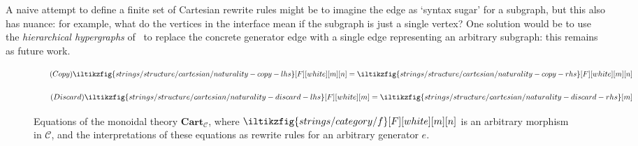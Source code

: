 \begin{remark}
    A naive attempt to define a finite set of Cartesian rewrite rules might be
    to imagine the edge as `syntax sugar' for a subgraph, but this also has
    nuance: for example, what do the vertices in the interface mean if the subgraph is just a
    single vertex?
    One solution would be to use the \emph{hierarchical hypergraphs}
    of~\cite{alvarez-picallo2022rewriting} to replace the concrete generator
    edge with a single edge representing an arbitrary subgraph: this remains
    as future work.
\end{remark}


\begin{figure}
    \centering
    \begin{minipage}{0.45\textwidth}
        \begin{equation}
            \tag{\(\mathsf{Copy}\)}
            \iltikzfig{strings/structure/cartesian/naturality-copy-lhs}[F][white][m][n]
            =
            \iltikzfig{strings/structure/cartesian/naturality-copy-rhs}[F][white][m][n]
            \label{eq:cartesian-copy}
        \end{equation}
    \end{minipage}
    \qquad
    \begin{minipage}{0.4\textwidth}
        \centering
        \begin{equation}
            \tag{\(\mathsf{Discard}\)}
            \iltikzfig{strings/structure/cartesian/naturality-discard-lhs}[F][white][m]
            =
            \iltikzfig{strings/structure/cartesian/naturality-discard-rhs}[m]
            \label{eq:cartesian-discard}
        \end{equation}
    \end{minipage}

    \begin{minipage}{0.45\textwidth}
        \begin{center}
            
        \end{center}
    \end{minipage}
    \begin{minipage}{0.4\textwidth}
        \begin{center}
            
        \end{center}
    \end{minipage}

    \caption{
        Equations of the monoidal theory \(\mathbf{Cart}_\mathcal{C}\),
        where \(\iltikzfig{strings/category/f}[F][white][m][n]\) is an arbitrary
        morphism in \(\mathcal{C}\), and the interpretations of these equations
        as rewrite rules for an arbitrary generator \(e\).
    }
    \label{fig:cartesian-equations}
\end{figure}